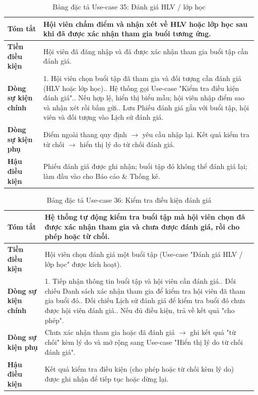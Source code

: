 \documentclass[a4paper,12pt]{article}
\begin{document}
\begin{table}[H]\centering\footnotesize
\begin{tabularx}{\textwidth}{|L{3.2cm}|Y|}
\hline \textbf{Tóm tắt} & Hội viên chấm điểm và nhận xét về HLV hoặc lớp học sau khi đã được xác nhận tham gia buổi tương ứng. \\ \hline
\textbf{Tiền điều kiện} & Hội viên đã đăng nhập và đã được xác nhận tham gia buổi tập cần đánh giá. \\ \hline
\textbf{Dòng sự kiện chính} & 1. Hội viên chọn buổi tập đã tham gia và đối tượng cần đánh giá (HLV hoặc lớp học).. Hệ thống gọi Use-case "Kiểm tra điều kiện đánh giá".. Nếu hợp lệ, hiển thị biểu mẫu; hội viên nhập điểm sao và nhận xét rồi bấm gửi.. Lưu Phiếu đánh giá gắn với buổi tập, hội viên và đối tượng vào Lịch sử đánh giá. \\ \hline
\textbf{Dòng sự kiện phụ} & Điểm ngoài thang quy định $\rightarrow$ yêu cầu nhập lại. Kết quả kiểm tra từ chối $\rightarrow$ hiển thị lý do từ chối đánh giá. \\ \hline
\textbf{Hậu điều kiện} & Phiếu đánh giá được ghi nhận; buổi tập đó không thể đánh giá lại; làm đầu vào cho Báo cáo \& Thống kê. \\ \hline
\end{tabularx}
\caption{Bảng đặc tả Use-case 35: Đánh giá HLV / lớp học}
\end{table}

\begin{table}[H]\centering\footnotesize
\begin{tabularx}{\textwidth}{|L{3.2cm}|Y|}
\hline \textbf{Tóm tắt} & Hệ thống tự động kiểm tra buổi tập mà hội viên chọn đã được xác nhận tham gia và chưa được đánh giá, rồi cho phép hoặc từ chối. \\ \hline
\textbf{Tiền điều kiện} & Hội viên chọn đánh giá một buổi tập (Use-case "Đánh giá HLV / lớp học" được kích hoạt). \\ \hline
\textbf{Dòng sự kiện chính} & 1. Tiếp nhận thông tin buổi tập và hội viên cần đánh giá.. Đối chiếu Danh sách xác nhận tham gia để kiểm tra hội viên đã tham gia buổi đó.. Đối chiếu Lịch sử đánh giá để kiểm tra buổi đó chưa được hội viên đánh giá.. Nếu đủ điều kiện, trả về kết quả "cho phép". \\ \hline
\textbf{Dòng sự kiện phụ} & Chưa xác nhận tham gia hoặc đã đánh giá $\rightarrow$ ghi kết quả "từ chối" kèm lý do và mở rộng sang Use-case "Hiển thị lý do từ chối đánh giá". \\ \hline
\textbf{Hậu điều kiện} & Kết quả kiểm tra điều kiện (cho phép hoặc từ chối kèm lý do) được ghi nhận để tiếp tục hoặc dừng lại. \\ \hline
\end{tabularx}
\caption{Bảng đặc tả Use-case 36: Kiểm tra điều kiện đánh giá}
\end{table}
\end{document}
